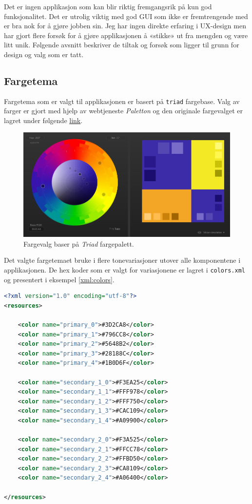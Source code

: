 Det er ingen applikasjon som kan blir riktig fremgangsrik på kun god funksjonalitet. Det er utrolig viktig med god GUI som ikke er fremtrengende med er bra nok for å gjøre jobben sin. Jeg har ingen direkte erfaring i UX-design men har gjort flere forsøk for å gjøre applikasjonen å «stikke» ut fra mengden og være litt unik. Følgende avsnitt beskriver de tiltak og forsøk som ligger til grunn for design og valg som er tatt.

\subsection{Fargetema}
Fargetema som er valgt til applikasjonen er basert på \texttt{triad} fargebase. Valg av farger er gjort med hjelp av webtjeneste \textit{Paletton} og den originale fargevalget er lagret under følgende \href{http://paletton.com/#uid=3470u0krausgVEBm0wFuzpjybk1}{link}.

\begin{figure}[ht]
\centering
 \includegraphics[scale=0.25]{./img/gui/4.png}
 \caption{Fargevalg baser på \textit{Triad} fargepalett.}
 \label{fig:gui_colors}
\end{figure}


Det valgte fargetemaet bruke i flere tonevariasjoner utover alle komponentene i applikasjonen. De hex koder som er valgt for variasjonene er lagret i \texttt{colors.xml} og presentert i eksempel \ref{xml:colors}.

\begin{lstlisting}[language=XML, caption=Fargepalett i colors.xml, label=xml:colors]
<?xml version="1.0" encoding="utf-8"?>
<resources>

    <color name="primary_0">#3D2CA8</color>
    <color name="primary_1">#796CC8</color>
    <color name="primary_2">#5648B2</color>
    <color name="primary_3">#28188C</color>
    <color name="primary_4">#1B0D6F</color>

    <color name="secondary_1_0">#F3EA25</color>
    <color name="secondary_1_1">#FFF978</color>
    <color name="secondary_1_2">#FFF750</color>
    <color name="secondary_1_3">#CAC109</color>
    <color name="secondary_1_4">#A09900</color>

    <color name="secondary_2_0">#F3A525</color>
    <color name="secondary_2_1">#FFCC78</color>
    <color name="secondary_2_2">#FFBD50</color>
    <color name="secondary_2_3">#CA8109</color>
    <color name="secondary_2_4">#A06400</color>

</resources>
\end{lstlisting}






